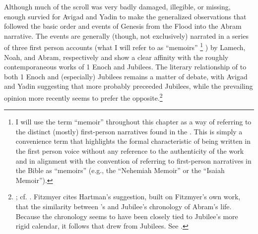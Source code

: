 Although much of the scroll was very badly damaged, illegible, or missing, enough survied for Avigad and Yadin to make the generalized observations that \ga followed the basic order and events of Genesis from the Flood into the Abram narrative. The events are generally (though, not exclusively) narrated in a series of three first person accounts (what I will refer to as ``memoirs''%
%
\footnote{I will use the term ``memoir'' throughout this chapter as a way of referring to the distinct (mostly) first-person narratives found in the \ga. This is simply a convenience term that highlights the formal characteristic of being written in the first person voice without any reference to the authenticity of the work and in alignment with the convention of referring to first-person narratives in the Bible as ``memoirs'' (e.g., the ``Nehemiah Memoir'' or the ``Isaiah Memoir'').}%
) by Lamech, Noah, and Abram, respectively and show a clear affinity with the roughly contemporaneous works of 1 Enoch and Jubilees.\autocite[16--37]{avigad-yadin1956} The literary relationship of \ga to both 1 Enoch and (especially) Jubilees remains a matter of debate, with Avigad and Yadin suggesting that \ga more probably preceeded Jubilees, while the prevailing opinion more recently seems to prefer the opposite.\footnote{\cite[38]{avigad-yadin1956}; cf. \cite[20--21]{fitzmyer2004}. Fitzmyer cites Hartman's suggestion, built on Fitzmyer's own work, that the similarity between \ga's and Jubilee's chronology of Abram's life. Because the chronology seems to have been closely tied to Jubilee's more rigid calendar, it follows that \ga drew from Jubilees. See \cite[497]{hartman_cbq1966}.}

